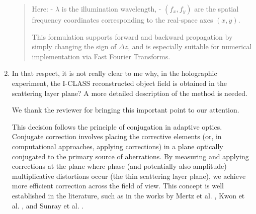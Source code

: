\documentclass[12pt]{article}
\newcommand{\hlred}[1]{\sethlcolor{red!30}\hl{#1}}
\newenvironment{solved_reviewercomment}
    {\begin{tcolorbox}[width=\linewidth,colback=gray!5,colframe=solved_commentcolor!50,title=Reviewer Comment,left=5pt,right=5pt]}
    {\end{tcolorbox}}
\newenvironment{ourresponse}
    {\begin{tcolorbox}[width=\linewidth,breakable,enhanced,colback=gray!5,colframe=responsecolor!50,title=Response,left=5pt,right=5pt]}
    {\end{tcolorbox}}
\begin{document}
\begin{enumerate}[label=\arabic*.]
\begin{ourresponse}
\begin{quote}
        Here:
        - $ \lambda $ is the illumination wavelength,
        - $ (f_x, f_y) $ are the spatial frequency coordinates corresponding to the real-space axes $ (x, y) $.
        
        This formulation supports forward and backward propagation by simply changing the sign of $ \Delta z $, and is especially suitable for numerical implementation via Fast Fourier Transforms.
        
    \end{quote}

            
\end{ourresponse}


    
\item \leavevmode\vspace{-\baselineskip}
\begin{solved_reviewercomment}
    In that respect, it is not really clear to me why, in the holographic experiment, the I-CLASS reconstructed object field is obtained in the scattering layer plane? A more detailed description of the method is needed.
\end{solved_reviewercomment}

\begin{ourresponse}

    We thank the reviewer for bringing this important point to our attention.
    
    This decision follows the principle of conjugation in adaptive optics. Conjugate correction involves placing the corrective elements (or, in computational approaches, applying corrections) in a plane optically conjugated to the primary source of aberrations. By measuring and applying corrections at the plane where phase (and potentially also amplitude) multiplicative distortions occur (the thin scattering layer plane), we achieve more efficient correction across the field of view. This concept is well established in the literature, such as in the works by Mertz et al. \cite{mertz2015field}, Kwon et al. \cite{kwon2023computational}, and Sunray et al. \cite{sunray2024beyond}.
    

\end{ourresponse}
\end{enumerate}
\end{document}
